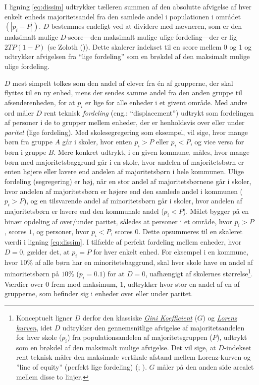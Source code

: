 \documentclass[
]{book}
\begin{document}
I ligning \eqref{eq:dissim} udtrykker tælleren summen af den absolutte afvigelse af hver enkelt enheds majoritetsandel fra den samlede andel i populationen i området \(\left( \left| p_{i} - P \right| \right)\). \(D\) bestemmes endeligt ved at dividere med nævneren, som er den maksimalt mulige \(D\)-score---den maksimalt mulige ulige fordeling---der er lig \(2TP \left( 1-P \right)\) (se Zoloth ()). Dette skalerer indekset til en score mellem 0 og 1 og udtrykker afvigelsen fra ``lige fordeling'' som en brøkdel af den maksimalt mulige ulige fordeling.

\(D\) mest simpelt tolkes som den andel af elever fra én af grupperne, der skal flyttes til en ny enhed, mens der sendes samme andel fra den anden gruppe til afsenderenheden, for at \(p_{i}\) er lige for alle enheder i et givent område. Med andre ord måler \(D\) rent teknisk \emph{fordeling} (eng.: ``displacement'') udtrykt som fordelingen af personer i de to grupper mellem enheder, der er henholdsvis over eller under \emph{paritet} (lige fordeling). Med skolesegregering som eksempel, vil sige, hvor mange børn fra gruppe \(A\) går i skoler, hvor enten \(p_{i}>P\) eller \(p_{i}<P\), og vice versa for børn i gruppe \(B\). Mere konkret udtrykt, i en given kommune, måles, hvor mange børn med majoritetsbaggrund går i en skole, hvor andelen af majoritetsbørn er enten højere eller lavere end andelen af majoritetsbørn i hele kommunen. Ulige fordeling (segregering) er høj, når en stor andel af majoritetsbørnene går i skoler, hvor andelen af majoritetsbørn er højere end den samlede andel i kommunen (\(p_{i} > P\)), og en tilsvarende andel af minoritetsbørn går i skoler, hvor andelen af majoritetsbørn er lavere end den kommunale andel (\(p_{i} < P\)). Målet bygger på en binær opdeling af over/under paritet, således at personer i et område, hvor \(p_{i}>P\), scores \(1\), og personer, hvor \(p_{i}<P\), scores \(0\). Dette opsummeres til en skaleret værdi i ligning \eqref{eq:dissim}. I tilfælde af perfekt fordeling mellem enheder, hvor \(D=0\), gælder det, at \(p_{i}=P\) for hver enkelt enhed. For eksempel i en kommune, hvor \(10\%\) af alle børn har en minoritetsbaggrund, skal hver skole have en andel af minoritetsbørn på \(10\%\) (\(p_{i}=0.1\)) for at \(D=0\), uafhængigt af skolernes størrelse\footnote{Konceptuelt ligner \(D\) derfor den klassiske \href{https://da.wikipedia.org/wiki/Gini-koefficient}{\emph{Gini Koefficient}} (\(G\)) og \href{https://da.wikipedia.org/wiki/Lorenz-kurve}{\emph{Lorenz kurven}}, idet \(D\) udtrykker den gennemsnitlige afvigelse af majoritetsandelen for hver skole (\(p_{i}\)) fra populationsandelen af majoritetsgruppen (\(P\)), udtrykt som en brøkdel af den maksimalt mulige afvigelse. Det vil sige, at \(D\)-indekset rent teknisk måler den maksimale vertikale afstand mellem Lorenz-kurven og ''line of equity'' (perfekt lige fordeling) (; ). \(G\) måler på den anden side arealet mellem disse to linjer.}. Værdier over \(0\) frem mod maksimum, \(1\), udtrykker hvor stor en andel af en af grupperne, som befinder sig i enheder over eller under paritet.
\end{document}
